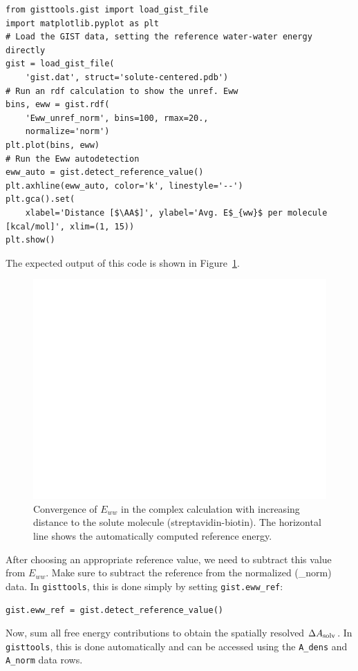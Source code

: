 \documentclass[9pt,tutorial]{livecoms}
\newcommand{\dasolv}{\Delta A_\textup{solv}}
\newcommand{\software}{\texttt}
\newcommand\inlinecode{\texttt}
\begin{document}
\begin{lstlisting}[style=python]
from gisttools.gist import load_gist_file
import matplotlib.pyplot as plt
# Load the GIST data, setting the reference water-water energy directly
gist = load_gist_file(
    'gist.dat', struct='solute-centered.pdb')
# Run an rdf calculation to show the unref. Eww 
bins, eww = gist.rdf(
    'Eww_unref_norm', bins=100, rmax=20.,
    normalize='norm')
plt.plot(bins, eww)
# Run the Eww autodetection
eww_auto = gist.detect_reference_value()
plt.axhline(eww_auto, color='k', linestyle='--')
plt.gca().set(
    xlabel='Distance [$\AA$]', ylabel='Avg. E$_{ww}$ per molecule [kcal/mol]', xlim=(1, 15))
plt.show()
\end{lstlisting}
The expected output of this code is shown in Figure~\ref{fig_ewwref}.
\begin{figure}
	\centering
	\includegraphics[width=0.8\linewidth]{figures/Eww_convergence.png}
	\caption{Convergence of $E_{ww}$ in the complex calculation with increasing distance to the solute molecule (streptavidin-biotin). The horizontal line shows the automatically computed reference energy.}\label{fig_ewwref}
\end{figure}
After choosing an appropriate reference value, we need to subtract this value from $E_{ww}$.
Make sure to subtract the reference from the normalized (\_norm) data.
In \software{gisttools}, this is done simply by setting \inlinecode{gist.eww\_ref}:
\begin{lstlisting}[style=python]
gist.eww_ref = gist.detect_reference_value()
\end{lstlisting}
Now, sum all free energy contributions to obtain the spatially resolved $\dasolv$.
In \software{gisttools}, this is done automatically and can be accessed using the \inlinecode{A\_dens} and \inlinecode{A\_norm} data rows.
\end{document}
